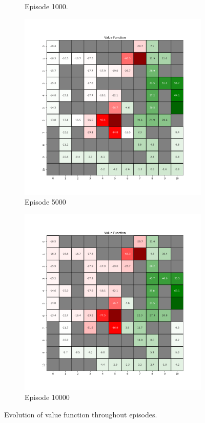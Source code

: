 \documentclass{assignment}
\begin{document}
\begin{figure}[H]
\begin{subfigure}{0.3\textwidth}
    \caption{Episode 1000.}
    \end{subfigure}\hfill
    \begin{subfigure}{0.3\textwidth}
        \includegraphics[width=\textwidth]{figures/value_td/default/value_function_alpha_0.1_gamma_0.95_epsilon_0.2_iteration_5000.png}
    \caption{Episode 5000}
    \end{subfigure}\hfill
    \begin{subfigure}{0.3\textwidth}
        \includegraphics[width=\textwidth]{figures/value_td/default/value_function_alpha_0.1_gamma_0.95_epsilon_0.2_iteration_10000.png}
    \caption{Episode 10000}
    \end{subfigure}
    \caption{Evolution of value function throughout episodes.}
    \label{fig:default_td_learning_value}
\end{figure}
\end{document}
